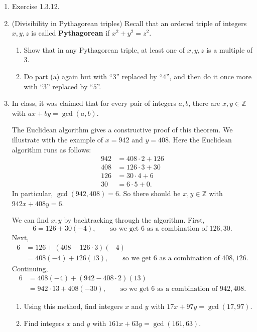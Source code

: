 \documentclass[11pt]{article}
\def\Z{\mathbb{Z}}
\theoremstyle{plain}
\theoremstyle{remark}
\begin{document}
\begin{enumerate}
\item Exercise 1.3.12.

\item (Divisibility in Pythagorean triples) Recall that an ordered triple of integers $x,y,z$ is called \textbf{Pythagorean} if $x^2+y^2=z^2$.
\begin{enumerate}
\item Show that in any Pythagorean triple, at least one of $x,y,z$ is a multiple of $3$.

\item Do part (a) again but with ``$3$'' replaced by ``$4$'', and then do it once more with ``$3$'' replaced by ``$5$''.
\end{enumerate}

\item In class, it was claimed that for every pair of integers $a,b$, there are $x,y \in \Z$ with $ax+by = \gcd(a,b)$.

The Euclidean algorithm gives a constructive proof of this theorem. We illustrate with the example of $x=942$ and $y=408$. Here the Euclidean algorithm runs as follows:
\begin{align*}
	942 &= 408 \cdot 2 + 126\\
	408 &= 126\cdot 3 + 30 \\
	126 &= 30 \cdot 4 + 6 \\
	30 &= 6 \cdot 5 + 0.
\end{align*}
In particular, $\gcd(942,408)=6$. So there should be $x,y \in \Z$ with $942x+408y=6$.

We can find $x,y$ by backtracking through the algorithm. First,
\[ 6 = 126 + 30(-4), \qquad\text{so we get $6$ as a combination of $126, 30$}. \]
Next,
\begin{align*} 6 &= 126 + (408-126\cdot 3)(-4) \\
	&= 408(-4) + 126(13), \qquad\text{so we get $6$ as a combination of $408, 126$}.
\end{align*}
Continuing,
\begin{align*} 6  &= 408(-4) + (942-408\cdot 2)(13)\\
	&=942\cdot 13 + 408(-30), \qquad\text{so we get $6$ as a combination of $942, 408$}.
\end{align*}
\begin{enumerate}
\item Using this method, find integers $x$ and $y$ with $17x+97y=\gcd(17,97)$.
\item Find integers $x$ and $y$ with $161x+63y = \gcd(161,63)$.
\end{enumerate}


\end{enumerate}
\end{document}
